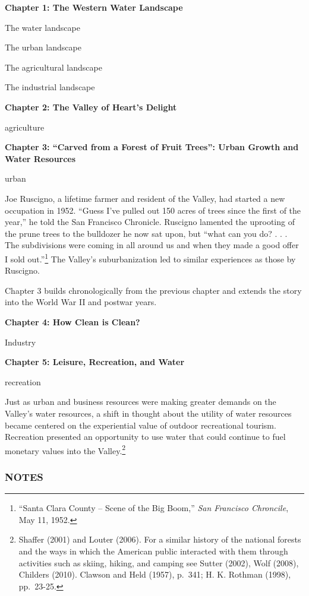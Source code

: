 \documentclass[11pt,article,oneside]{memoir}
\begin{document}
\textbf{Chapter 1: The Western Water Landscape}

The water landscape

The urban landscape

The agricultural landscape

The industrial landscape

\textbf{Chapter 2: The Valley of Heart's Delight}

agriculture

\textbf{Chapter 3: ``Carved from a Forest of Fruit Trees'': Urban Growth
and Water Resources}

urban

Joe Ruscigno, a lifetime farmer and resident of the Valley, had started
a new occupation in 1952. ``Guess I've pulled out 150 acres of trees
since the first of the year,'' he told the San Francisco Chronicle.
Ruscigno lamented the uprooting of the prune trees to the bulldozer he
now sat upon, but ``what can you do? . . . The subdivisions were coming
in all around us and when they made a good offer I sold out.''\footnote{``Santa
  Clara County -- Scene of the Big Boom,'' \emph{San Francisco
  Chroncile}, May 11, 1952.} The Valley's suburbanization led to similar
experiences as those by Ruscigno.

Chapter 3 builds chronologically from the previous chapter and extends
the story into the World War II and postwar years.

\textbf{Chapter 4: How Clean is Clean?}

Industry

\textbf{Chapter 5: Leisure, Recreation, and Water}

recreation

Just as urban and business resources were making greater demands on the
Valley's water resources, a shift in thought about the utility of water
resources became centered on the experiential value of outdoor
recreational tourism. Recreation presented an opportunity to use water
that could continue to fuel monetary values into the Valley.\footnote{Shaffer
  (2001) and Louter (2006). For a similar history of the national
  forests and the ways in which the American public interacted with them
  through activities such as skiing, hiking, and camping see Sutter
  (2002), Wolf (2008), Childers (2010). Clawson and Held (1957), p.~341;
  H. K. Rothman (1998), pp.~23-25.}

\subsubsection{NOTES}
\end{document}
